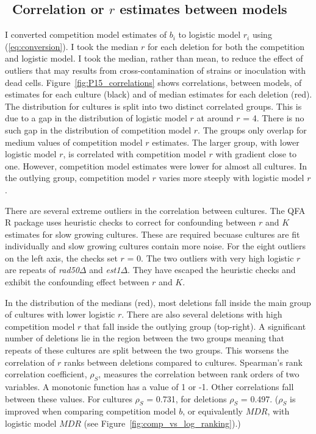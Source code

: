 \subsection{\boldmath \thesubsection~Correlation or \(r\) estimates between models \unboldmath}

I converted competition model estimates of \(b_{i}\) to logistic model
\(r_{i}\) using (\ref{eq:conversion}). I took the median \(r\) for
each deletion for both the competition and logistic model. I took the
median, rather than mean, to reduce the effect of outliers that may
results from cross-contamination of strains or inoculation with dead
cells. Figure~\ref{fig:P15_correlations} shows correlations, between
models, of estimates for each culture (black) and of median estimates
for each deletion (red). The distribution for cultures is split into
two distinct correlated groups. This is due to a gap in the
distribution of logistic model \(r\) at around \(r\) = 4. There is no
such gap in the distribution of competition model \(r\). The groups
only overlap for medium values of competition model \(r\)
estimates. The larger group, with lower logistic model \(r\), is
correlated with competition model \(r\) with gradient close to
one. However, competition model estimates were lower for almost all
cultures. In the outlying group, competition model \(r\) varies more
steeply with logistic model \(r\).

There are several extreme outliers in the correlation between
cultures. The QFA R package uses heuristic checks to correct for
confounding between \(r\) and \(K\) estimates for slow growing
cultures. These are required becuase cultures are fit individually and
slow growing cultures contain more noise. For the eight outliers on
the left axis, the checks set \(r\) = 0. The two outliers with very
high logistic \(r\) are repeats of \textit{rad50\(\Delta\)} and
\textit{est1\(\Delta\)}. They have escaped the heuristic checks and
exhibit the confounding effect between \(r\) and \(K\).

In the distribution of the medians (red), most deletions fall inside
the main group of cultures with lower logistic \(r\). There are also
several deletions with high competition model \(r\) that fall inside
the outlying group (top-right). A significant number of deletions lie
in the region between the two groups meaning that repeats of these
cultures are split between the two groups. This worsens the
correlation of \(r\) ranks between deletions compared to cultures.
Spearman's rank correlation coefficient, \(\rho_{S}\), measures the
correlation between rank orders of two variables. A monotonic function
has a value of 1 or -1. Other correlations fall between these
values. For cultures \(\rho_{S}\) = 0.731, for deletions \(\rho_{S}\)
= 0.497. (\(\rho_{S}\) is improved when comparing competition model
\(b\), or equivalently \(MDR\), with logistic model \(MDR\) (see
Figure~\ref{fig:comp_vs_log_ranking}).)

